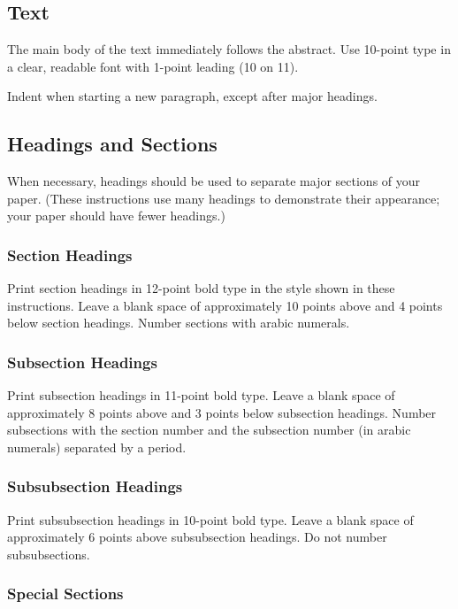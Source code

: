 \documentclass{article}
\begin{document}
\subsection{Text}

The main body of the text immediately follows the abstract. Use
10-point type in a clear, readable font with 1-point leading (10 on
11).

Indent when starting a new paragraph, except after major headings.

\subsection{Headings and Sections}

When necessary, headings should be used to separate major sections of
your paper. (These instructions use many headings to demonstrate their
appearance; your paper should have fewer headings.)

\subsubsection{Section Headings}

Print section headings in 12-point bold type in the style shown in
these instructions. Leave a blank space of approximately 10 points
above and 4 points below section headings.  Number sections with
arabic numerals.

\subsubsection{Subsection Headings}

Print subsection headings in 11-point bold type. Leave a blank space
of approximately 8 points above and 3 points below subsection
headings. Number subsections with the section number and the
subsection number (in arabic numerals) separated by a
period.

\subsubsection{Subsubsection Headings}

Print subsubsection headings in 10-point bold type. Leave a blank
space of approximately 6 points above subsubsection headings. Do not
number subsubsections.

\subsubsection{Special Sections}
\end{document}

